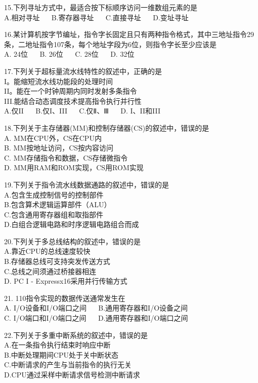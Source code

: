 15.下列寻址方式中，最适合按下标顺序访问一维数组元素的是 \\
A.相对寻址 $\quad$ B.寄存器寻址 $\quad$ C.直接寻址 $\quad$ D.变址寻址

16.某计算机按字节编址，指令字长固定且只有两种指令格式，其中三地址指令29条，二地址指令107条，每个地址字段为6位，则指令字长至少应该是 \\
A. 24位  $\quad$  B. 26位  $\quad$  C. 28位  $\quad$  D. 32位

17.下列关于超标量流水线特性的叙述中，正确的是 \\
I。能缩短流水线功能段的处理时间 \\
II。能在一个时钟周期内同时发射多条指令 \\
III.能结合动态调度技术提高指令执行并行性 \\
A.仅II  $\quad$  B.仅I、III  $\quad$  C.仅Ⅱ、Ⅲ  $\quad$  D.  I、II和III

18.下列关于主存储器(MM)和控制存储器(CS)的叙述中，错误的是 \\
A. MM在CPU外，CS在CPU内 \\
B. MM按地址访问，CS按内容访问 \\
C. MM存储指令和数据，CS存储微指令 \\
D. MM用RAM和ROM实现，CS用ROM实现

19.下列关于指令流水线数据通路的叙述中，错误的是 \\
A.包含生成控制信号的控制部件 \\
B.包含算术逻辑运算部件（ALU） \\
C.包含通用寄存器组和取指部件 \\
D.白组合逻辑电路和时序逻辑电路组合而成

20.下列关于多总线结构的叙述中，错误的是 \\
A.靠近CPU的总线速度较快 \\
B.存储器总线可支持突发传送方式 \\
C.总线之间须通过桥接器相连 \\
D.  PC I - Expressx16采用并行传输方式

21. 110指令实现的数据传送通常发生在 \\
A. I/O设备和I/O端口之间  $\quad$  B.通用寄存器和I/O设备之间 \\
C. I/O端口和I/O端口之间  $\quad$  D.通用寄存器和I/O端口之间

22.下列关于多重中断系统的叙述中，错误的是 \\
A.在一条指令执行结束时响应中断 \\
B.中断处理期间CPU处于关中断状态 \\
C.中断请求的产生与当前指令的执行无关 \\
D.CPU通过采样中断请求信号检测中断请求 \\

